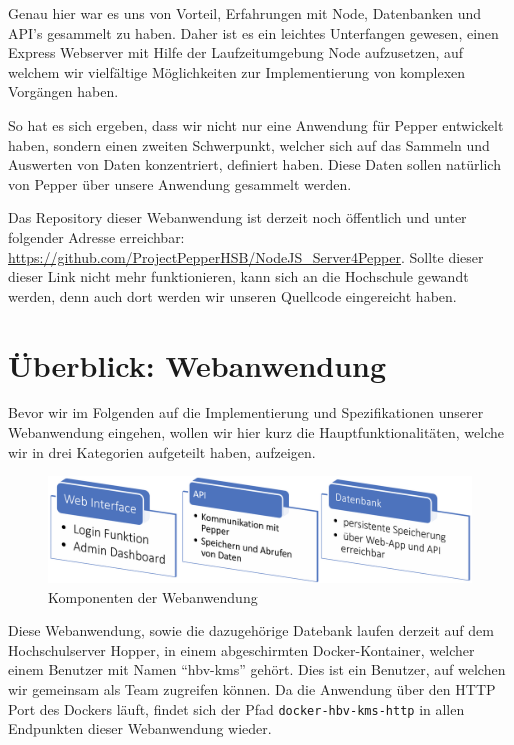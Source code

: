 Genau hier war es uns von Vorteil, Erfahrungen mit Node, Datenbanken und API's gesammelt zu haben.
Daher ist es ein leichtes Unterfangen gewesen, einen Express Webserver mit Hilfe der Laufzeitumgebung Node aufzusetzen,
auf welchem wir vielfältige Möglichkeiten zur Implementierung von komplexen Vorgängen haben.

So hat es sich ergeben, dass wir nicht nur eine Anwendung für Pepper entwickelt haben, sondern einen
zweiten Schwerpunkt, welcher sich auf das Sammeln und Auswerten von Daten konzentriert, definiert haben. Diese Daten
sollen natürlich von Pepper über unsere Anwendung gesammelt werden.

Das Repository dieser Webanwendung ist derzeit noch öffentlich und unter folgender Adresse erreichbar:
\href{https://github.com/ProjectPepperHSB/NodeJS\_Server4Pepper}{https://github.com/ProjectPepperHSB/NodeJS\_Server4Pepper}.
Sollte dieser dieser Link nicht mehr funktionieren, kann sich an die Hochschule gewandt werden, denn auch dort
werden wir unseren Quellcode eingereicht haben.

\section{Überblick: Webanwendung}
\label{sec:nodechapter-ueberblick}
Bevor wir im Folgenden auf die Implementierung und Spezifikationen unserer Webanwendung eingehen, wollen wir hier kurz
die Hauptfunktionalitäten, welche wir in drei Kategorien aufgeteilt haben, aufzeigen.

\begin{figure}[H]
    \includegraphics[width=\textwidth]{Figures/NodeChapter/WebAppComponents.png}
    \caption{Komponenten der Webanwendung}
    \label{fig:webappcomponents}
    \centering
\end{figure}

Diese Webanwendung, sowie die dazugehörige Datebank laufen derzeit auf dem Hochschulserver Hopper, in einem
abgeschirmten Docker-Kontainer, welcher einem Benutzer mit Namen ``hbv-kms'' gehört. Dies ist ein
Benutzer, auf welchen wir gemeinsam als Team zugreifen können. Da die Anwendung über den HTTP
Port des Dockers läuft, findet sich der Pfad \verb|docker-hbv-kms-http| in allen Endpunkten dieser Webanwendung wieder.

